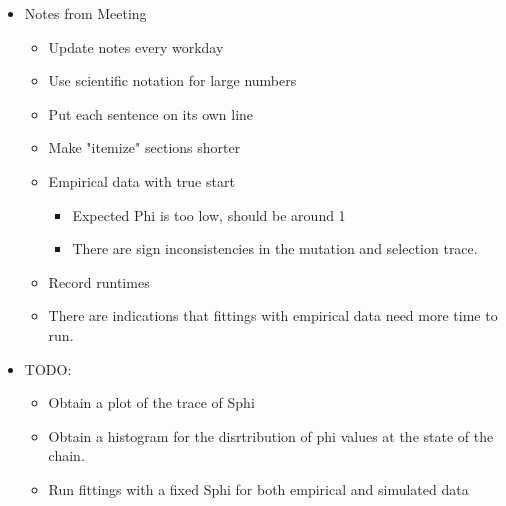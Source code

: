 \documentclass[11pt]{labbook}
\begin{document}
    \begin{itemize}
        \item Notes from Meeting
            \begin{itemize}
                \item Update notes every workday
                \item Use scientific notation for large numbers
                \item Put each sentence on its own line
                \item Make "itemize" sections shorter
                \item Empirical data with true start
                    \begin{itemize}
                        \item Expected Phi is too low, should be around 1
                        \item There are sign inconsistencies in the mutation and selection trace.
                    \end{itemize}
                \item Record runtimes
                \item There are indications that fittings with empirical data need more time to run.
            \end{itemize}
        \item TODO:
            \begin{itemize}
                \item Obtain a plot of the trace of Sphi
                \item Obtain a histogram for the disrtribution of phi values at the state of the chain.
                \item Run fittings with a fixed Sphi for both empirical and simulated data
            \end{itemize}
    \end{itemize}
    
\end{document}

